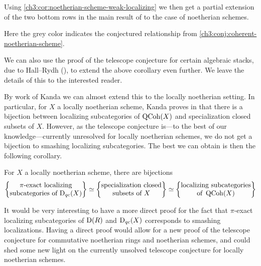 Using \cref{ch3:cor:noetherian-scheme-weak-localizing} we then get a partial extension of the two bottom rows in the main result of \cite{takahashi_2009} to the case of noetherian schemes.  

\begin{center}
\end{center}

Here the grey color indicates the conjectured relationship from \cref{ch3:conj:coherent-noetherian-scheme}. 

We can also use the proof of the telescope conjecture for certain algebraic stacks, due to Hall--Rydh (\cite{hall-rydh_2017}), to extend the above corollary even further. We leave the details of this to the interested reader. 

By work of Kanda we can almost extend this to the locally noetherian setting. In particular, for $X$ a locally noetherian scheme, Kanda proves in \cite[1.4]{kanda_2015} that there is a bijection between localizing subcategories of $\operatorname{QCoh}(X)$ and specialization closed subsets of $X$. However, as the telescope conjecture is---to the best of our knowledge---currently unresolved for locally noetherian schemes, we do not get a bijection to smashing localizing subcategories. The best we can obtain is then the following corollary. 

\begin{corollary}
    For $X$ a locally noetherian scheme, there are bijections
    \[\left\{ \begin{matrix} \pi\text{-exact localizing}\\ \text{subcategories of }\mathrm{D}_{qc}(X) \end{matrix} \right\}\simeq \left\{ \begin{matrix} \text{specialization closed}\\ \text{subsets of }X \end{matrix} \right\} \simeq \left\{ \begin{matrix} \text{localizing subcategories}\\ \text{of }\operatorname{QCoh}(X) \end{matrix} \right\}\]
\end{corollary}

\begin{remark}
    It would be very interesting to have a more direct proof for the fact that $\pi$-exact localizing subcategories of $\mathrm{D}(R)$ and $\mathrm{D}_{qc}(X)$ corresponds to smashing localizations. Having a direct proof would allow for a new proof of the telescope conjecture for commutative noetherian rings and noetherian schemes, and could shed some new light on the currently unsolved telescope conjecture for locally noetherian schemes. 
\end{remark}

